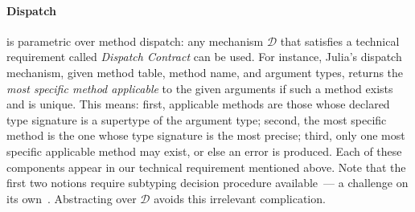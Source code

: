 \documentclass[oneside,openright,titlepage,numbers=noenddot,%
headinclude,footinclude,cleardoublepage=empty,abstract=on,
BCOR=5mm,paper=a4,fontsize=11pt,
dvipsnames
]{scrreprt}
\begin{document}


\paragraph{Dispatch}\label{sec:disp}

\jules is parametric over method dispatch: any mechanism $\mathcal D$ that
satisfies a technical requirement called \emph{Dispatch Contract} can be used.
For instance, Julia's dispatch mechanism, given method table, method name, and argument types,
returns the \emph{most specific method applicable} to the given arguments
if such a method exists and is unique. This means: first, applicable
methods are those whose declared type signature is a supertype of the argument
type; second, the most specific method is the one whose type signature is the
most precise; third, only one most specific applicable method may exist, or
else an error is produced. Each of these components appear in our technical
requirement mentioned above. Note that the first two notions require subtyping
decision procedure available~--- a challenge on its own~\cite{oopsla18b}. Abstracting over
$\mathcal D$ avoids this irrelevant complication.

\end{document}
